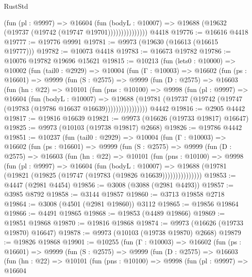 \begin{lexlean}{RustStd}
\begin{coremodule}
                      (fun (pl : @9997) =>
                      @16604
                        (fun (bodyL : @10007) =>
                        @19688 (@19632 (@19737 (@19742 (@19747 @19701)))))))))))))))
    @4418
@19776 := @16616 @4418
@19777 := @19776 @9991
@19781 := @9973 (@19630 (@16613 (@16615 @19777)))
@19782 := @10073 @4418
@19783 := @16673 @19782
@19786 := @10076 @19782 @19696 @15621
@19815 := @10213
    (fun (lets0 : @10000) =>
    @10002
      (fun (tail0 : @2929) =>
      @10004
        (fun (Γ : @10003) =>
        @16602
          (fun (ps : @16601) =>
          @9999
            (fun (S : @2575) =>
            @9999
              (fun (D : @2575) =>
              @16603
                (fun (hn : @22) =>
                @10101
                  (fun (pns : @10100) =>
                  @9998
                    (fun (pl : @9997) =>
                    @16604
                      (fun (bodyL : @10007) =>
                      @19688
                        (@19781
                          (@19737 (@19742 (@19747 (@19783 (@19786 @16637 @16639))))))))))))))))
    @4442
@19816 := @2905 @4442
@19817 := @19816 @16639
@19821 := @9973 (@16626 (@19733 @19817) @16647)
@19825 := @9973 (@10103 (@19738 @19817) @2668)
@19826 := @19786 @4442
@19851 := @10237
    (fun (tail0 : @2929) =>
    @10004
      (fun (Γ : @10003) =>
      @16602
        (fun (ps : @16601) =>
        @9999
          (fun (S : @2575) =>
          @9999
            (fun (D : @2575) =>
            @16603
              (fun (hn : @22) =>
              @10101
                (fun (pns : @10100) =>
                @9998
                  (fun (pl : @9997) =>
                  @16604
                    (fun (bodyL : @10007) =>
                    @19688 (@19781 (@19821 (@19825 (@19747 (@19783 (@19826 @16639)))))))))))))))
@19853 := @4447 (@2981 @4454)
@19856 := @3008 (@3088 (@2981 @4493))
@19857 := @3985 @8792
@19858 := @3144 @19857
@19860 := @3713 @19858 @2718
@19864 := @3008 (@4501 (@2981 @19860)) @3112
@19865 := @19856 @19864
@19866 := @4491 @19865
@19868 := @19853 (@4489 @19866)
@19869 := @19851 @19868
@19870 := @19816 @19868
@19874 := @9973 (@16626 (@19733 @19870) @16647)
@19878 := @9973 (@10103 (@19738 @19870) @2668)
@19879 := @19826 @19868
@19901 := @10255
    (fun (Γ : @10003) =>
    @16602
      (fun (ps : @16601) =>
      @9999
        (fun (S : @2575) =>
        @9999
          (fun (D : @2575) =>
          @16603
            (fun (hn : @22) =>
            @10101
              (fun (pns : @10100) =>
              @9998
                (fun (pl : @9997) =>
                @16604

\end{coremodule}
\end{lexlean}

